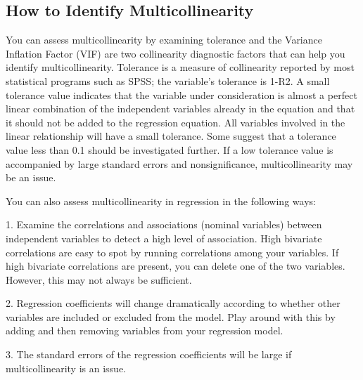 \documentclass[]{report}
\begin{document}
\subsection{How to Identify Multicollinearity}

     You can assess multicollinearity by examining tolerance and the Variance Inflation Factor (VIF) are two collinearity diagnostic factors that can help you identify multicollinearity. Tolerance is a measure of collinearity reported by most statistical programs such as SPSS; the variable’s tolerance is 1-R2. A small tolerance value indicates that the variable under consideration is almost a perfect linear combination of the independent variables already in the equation and that it should not be added to the regression equation. All variables involved in the linear relationship will have a small tolerance. Some suggest that a tolerance value less than 0.1 should be investigated further. If a low tolerance value is accompanied by large standard errors and nonsignificance, multicollinearity may be an issue.
%
%

You can also assess multicollinearity in regression in the following ways:

1. Examine the correlations and associations (nominal variables) between independent variables to detect a high level of association. High bivariate correlations are easy to spot by running correlations among your variables. If high bivariate correlations are present, you can delete one of the two variables. However, this may not always be sufficient.

2. Regression coefficients will change dramatically according to whether other variables are included or excluded from the model. Play around with this by adding and then removing variables from your regression model.

3. The standard errors of the regression coefficients will be large if multicollinearity is an issue.
\end{document}
